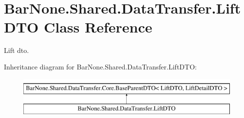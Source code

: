 \hypertarget{class_bar_none_1_1_shared_1_1_data_transfer_1_1_lift_d_t_o}{}\section{Bar\+None.\+Shared.\+Data\+Transfer.\+Lift\+D\+TO Class Reference}
\label{class_bar_none_1_1_shared_1_1_data_transfer_1_1_lift_d_t_o}


Lift dto.  


Inheritance diagram for Bar\+None.\+Shared.\+Data\+Transfer.\+Lift\+D\+TO\+:\begin{figure}[H]
\begin{center}
\leavevmode
\includegraphics[height=2.000000cm]{class_bar_none_1_1_shared_1_1_data_transfer_1_1_lift_d_t_o}
\end{center}
\end{figure}
